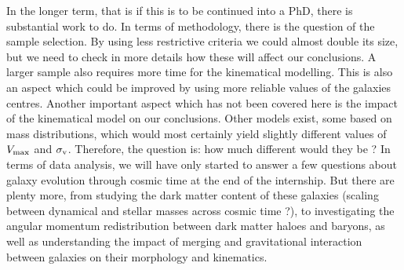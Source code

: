 In the longer term, that is if this is to be continued into a PhD, there is substantial work to do. In terms of methodology, there is the question of the sample selection. By using less restrictive criteria we could almost double its size, but we need to check in more details how these will affect our conclusions. A larger sample also requires more time for the kinematical modelling. This is also an aspect which could be improved by using more reliable values of the galaxies centres. Another important aspect which has not been covered here is the impact of the kinematical model on our conclusions. Other models exist, some based on mass distributions, which would most certainly yield slightly different values of $V_{\rm{max}}$ and $\sigma_{\rm{v}}$. Therefore, the question is: how much different would they be ? In terms of data analysis, we will have only started to answer a few questions about galaxy evolution through cosmic time at the end of the internship. But there are plenty more, from studying the dark matter content of these galaxies (scaling between dynamical and stellar masses across cosmic time ?), to investigating the angular momentum redistribution between dark matter haloes and baryons, as well as understanding the impact of merging and gravitational interaction between galaxies on their morphology and kinematics. 